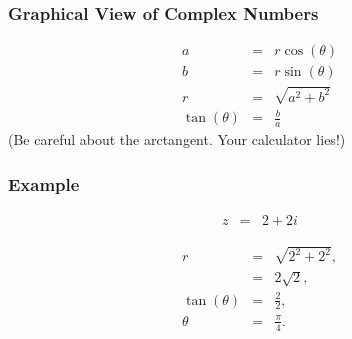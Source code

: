 \begin{frame}
  \frametitle{Graphical View of Complex Numbers}

  
  \begin{eqnarray*}
    a & = & r\cos(\theta) \\
    b & = & r\sin(\theta) \\
    r & = & \sqrt{a^2+b^2} \\
    \tan(\theta) & = & \frac{b}{a}
  \end{eqnarray*}
  (Be careful about the arctangent. Your calculator lies!)

\end{frame}


\begin{frame}
  \frametitle{Example}

  \begin{eqnarray*}
    z & = &  2 + 2i
  \end{eqnarray*}

  {%

    \begin{eqnarray*}
      r & = & \sqrt{2^2+2^2}, \\
        & = & 2\sqrt{2}, \\
      \tan(\theta) & = & \frac{2}{2}, \\
      \theta       & = & \frac{\pi}{4}.
    \end{eqnarray*}

  }

\end{frame}


